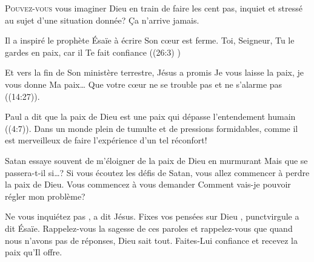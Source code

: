 
\lettrine{P}{ouvez-vous} vous imaginer Dieu en train de faire les cent pas,
 inquiet et stressé au sujet d'une situation donnée? Ça n'arrive jamais. 

Il a inspiré le prophète Ésaïe à écrire\frcolon{} 
 \Og Son c\oe{}ur est ferme. Toi, Seigneur, Tu le gardes en paix,
 car il Te fait confiance \Fg{}
 ((26:3) \BFC) 


Et vers la fin de Son ministère terrestre, Jésus a promis\frcolon{}
 \Og Je vous laisse la paix, je vous donne Ma paix\dots{}
 Que votre c\oe{}ur ne se trouble pas et ne s'alarme pas \Fg{}
 ((14:27)). 

Paul a dit que la paix de Dieu est une paix qui dépasse l'entendement humain
 ((4:7)).
 Dans un monde plein de tumulte et de pressions formidables,
 comme il est merveilleux de faire l'expérience d'un tel réconfort! 

Satan essaye souvent de m'éloigner de la paix de Dieu en murmurant\frcolon{}
 \Og Mais que se passera-t-il si\dots{}? \Fg{} 
 Si vous écoutez les défis de Satan, vous allez commencer
 à perdre la paix de Dieu. Vous commencez à vous demander\frcolon{}
 \Og Comment vais-je pouvoir régler mon problème? \Fg{} 

\Og Ne vous inquiétez pas \Fg{}, 
 a dit Jésus.
 \Og Fixes vos 
 pensées sur Dieu \Fg{}, punct{virgule}
 a dit Ésaïe.
 Rappelez-vous la sagesse de ces paroles et rappelez-vous que
 quand nous n'avons pas de réponses, Dieu sait tout.
 Faites-Lui confiance et recevez la paix qu'Il offre.

\dvrule



